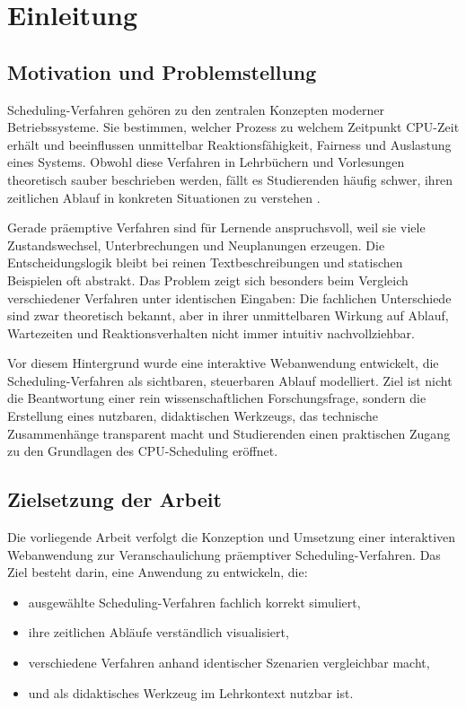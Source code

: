 \chapter{Einleitung}

\section{Motivation und Problemstellung}

Scheduling-Verfahren gehören zu den zentralen Konzepten moderner Betriebssysteme. Sie bestimmen, welcher Prozess zu welchem Zeitpunkt CPU-Zeit erhält und beeinflussen unmittelbar Reaktionsfähigkeit, Fairness und Auslastung eines Systems. Obwohl diese Verfahren in Lehrbüchern und Vorlesungen theoretisch sauber beschrieben werden, fällt es Studierenden häufig schwer, ihren zeitlichen Ablauf in konkreten Situationen zu verstehen \cite{silberschatz2018operating,tanenbaum2014modern}.

Gerade präemptive Verfahren sind für Lernende anspruchsvoll, weil sie viele Zustandswechsel, Unterbrechungen und Neuplanungen erzeugen. Die Entscheidungslogik bleibt bei reinen Textbeschreibungen und statischen Beispielen oft abstrakt. Das Problem zeigt sich besonders beim Vergleich verschiedener Verfahren unter identischen Eingaben: Die fachlichen Unterschiede sind zwar theoretisch bekannt, aber in ihrer unmittelbaren Wirkung auf Ablauf, Wartezeiten und Reaktionsverhalten nicht immer intuitiv nachvollziehbar.

Vor diesem Hintergrund wurde eine interaktive Webanwendung entwickelt, die Scheduling-Verfahren als sichtbaren, steuerbaren Ablauf modelliert. Ziel ist nicht die Beantwortung einer rein wissenschaftlichen Forschungsfrage, sondern die Erstellung eines nutzbaren, didaktischen Werkzeugs, das technische Zusammenhänge transparent macht und Studierenden einen praktischen Zugang zu den Grundlagen des CPU-Scheduling eröffnet.

\section{Zielsetzung der Arbeit}

Die vorliegende Arbeit verfolgt die Konzeption und Umsetzung einer interaktiven Webanwendung zur Veranschaulichung präemptiver Scheduling-Verfahren. Das Ziel besteht darin, eine Anwendung zu entwickeln, die:

\begin{itemize}
    \item ausgewählte Scheduling-Verfahren fachlich korrekt simuliert,
    \item ihre zeitlichen Abläufe verständlich visualisiert,
    \item verschiedene Verfahren anhand identischer Szenarien vergleichbar macht,
    \item und als didaktisches Werkzeug im Lehrkontext nutzbar ist.
\end{itemize}

